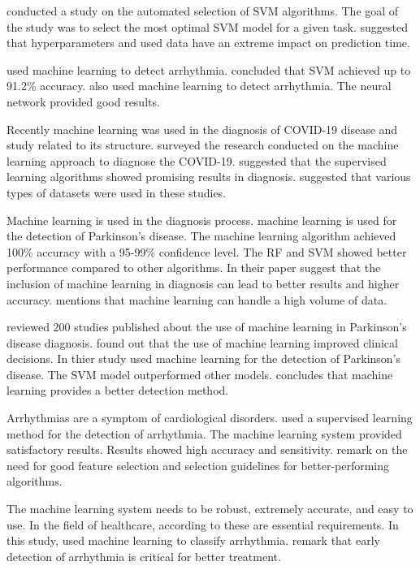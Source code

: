 \documentclass[a4paper,fleqn]{cas-dc}
\begin{document}
\cite*{ref_paper_2} conducted a study on the automated selection of SVM algorithms. The goal of the study was to select the most optimal SVM model for a given task. \citeauthor{ref_paper_2} suggested that hyperparameters and used data have an extreme impact on prediction time.

\cite*{ref_paper_38} used machine learning to detect arrhythmia. \citeauthor{ref_paper_38} concluded that SVM achieved up to 91.2\% accuracy. \cite*{ref_paper_16} also used machine learning to detect arrhythmia. The neural network provided good results.

Recently machine learning was used in the diagnosis of COVID-19 disease and study related to its structure. \cite*{ref_paper_20} surveyed the research conducted on the machine learning approach to diagnose the COVID-19. \citeauthor{ref_paper_20} suggested that the supervised learning algorithms showed promising results in diagnosis. \citeauthor{ref_paper_20} suggested that various types of datasets were used in these studies.

Machine learning is used in the diagnosis process. \cite*{ref_paper_34} machine learning is used for the detection of Parkinson's disease. The machine learning algorithm achieved 100\% accuracy with a 95-99\% confidence level. The RF and SVM showed better performance compared to other algorithms. In their paper \cite*{ref_paper_15} suggest that the inclusion of machine learning in diagnosis can lead to better results and higher accuracy. \citeauthor{ref_paper_15} mentions that machine learning can handle a high volume of data.

\cite*{ref_paper_27} reviewed 200 studies published about the use of machine learning in Parkinson's disease diagnosis. \citeauthor{ref_paper_27} found out that the use of machine learning improved clinical decisions. In thier study \cite*{ref_paper_30} used machine learning for the detection of Parkinson's disease. The SVM model outperformed other models. \citeauthor{ref_paper_30} concludes that machine learning provides a better detection method.

Arrhythmias are a symptom of cardiological disorders. \cite*{ref_paper_28} used a supervised learning method for the detection of arrhythmia. The machine learning system provided satisfactory results. Results showed high accuracy and sensitivity. \citeauthor{ref_paper_28} remark on the need for good feature selection and selection guidelines for better-performing algorithms.

The machine learning system needs to be robust, extremely accurate, and easy to use. In the field of healthcare, according to \cite*{ref_paper_4} these are essential requirements. In this study, \citeauthor{ref_paper_4} used machine learning to classify arrhythmia. \citeauthor{ref_paper_4} remark that early detection of arrhythmia is critical for better treatment.
\end{document}
